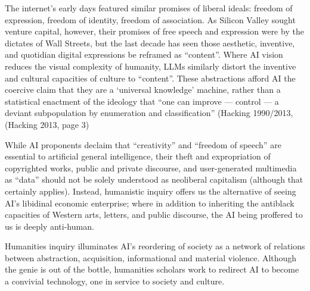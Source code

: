 The internet’s early days featured similar promises of liberal ideals: freedom of expression, freedom of identity, freedom of association.  As Silicon Valley sought venture capital, however, their promises of free speech and expression were by the dictates of Wall Streets, but the last decade has seen those aesthetic, inventive, and quotidian digital expressions be reframed as ``content''.  Where AI vision reduces the visual complexity of humanity, LLMs similarly distort the inventive and cultural capacities of culture to ``content''.  These abstractions afford AI the coercive claim that they are a ‘universal knowledge’ machine, rather than a statistical enactment of the ideology that ``one can improve --- control --- a deviant subpopulation by enumeration and classification'' (Hacking 1990/2013, (Hacking 2013, page 3) 
 
While AI proponents declaim that ``creativity'' and ``freedom of speech'' are essential to artificial general intelligence, their theft and expropriation of copyrighted works, public and private discourse, and user-generated multimedia as ``data'' should not be solely understood as neoliberal capitalism (although that certainly applies).  Instead, humanistic inquiry offers us the alternative of seeing AI’s libidinal economic enterprise; where in addition to inheriting the antiblack capacities of Western arts, letters, and public discourse, the AI being proffered to us is deeply anti-human.

Humanities inquiry illuminates AI’s reordering of society as a network of relations between abstraction, acquisition, informational and material violence.  Although the genie is out of the bottle, humanities scholars work to redirect AI to become a convivial technology, one in service to society and culture. 
